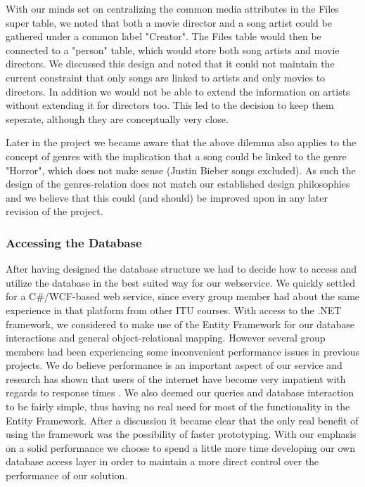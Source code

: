 With our minds set on centralizing the common media attributes in the Files super table, we noted that both a movie director and a song artist could be gathered under a common label "Creator". The Files table would then be connected to a "person" table, which would store both song artists and movie directors.
We discussed this design and noted that it could not maintain the current constraint that only songs are linked to artists and only movies to directors. In addition we would not be able to extend the information on artists without extending it for directors too. This led to the decision to keep them seperate, although they are conceptually very close.

Later in the project we became aware that the above dilemma also applies to the concept of genres with the implication that a song could be linked to the genre "Horror", which does not make sense (Justin Bieber songs excluded). As such the design of the genres-relation does not match our established design philosophies and we believe that this could (and should) be improved upon in any later revision of the project.

\subsubsection{Accessing the Database}
\label{sec:databaseaccess}
After having designed the database structure we had to decide how to access and utilize the database in the best suited way for our webservice. We quickly settled for a C\#/WCF-based web service, since every group member had about the same experience in that platform from other ITU courses.
With access to the .NET framework, we considered to make use of the Entity Framework for our database interactions and general object-relational mapping. However several group members had been experiencing some inconvenient performance issues in previous projects. We do believe performance is an important aspect of our service and research has shown that users of the internet have become very impatient with regards to response times \cite{webusersflee}. We also deemed our queries and database interaction to be fairly simple, thus having no real need for most of the functionality in the Entity Framework. After a discussion it became clear that the only real benefit of using the framework was the possibility of faster prototyping. With our emphasis on a solid performance we choose to spend a little more time developing our own database access layer in order to maintain a more direct control over the performance of our solution.



